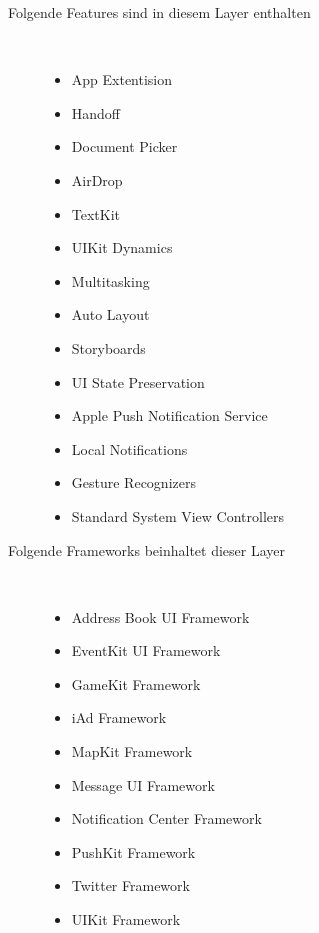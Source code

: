 \begin{description}
\begin{itemize}
		\begin{description}
		\item[Folgende Features sind in diesem Layer enthalten]~\par
		\begin{multicols}{2}
		\begin{itemize}
			\item App Extentision
			\item Handoff
			\item Document Picker
			\item AirDrop
			\item TextKit
			\item UIKit Dynamics
			\item Multitasking
			\item Auto Layout
			\item Storyboards
			\item UI State Preservation
			\item Apple Push Notification Service
			\item Local Notifications
			\item Gesture Recognizers
			\item Standard System View Controllers
         	\end{itemize}
		\end{multicols}
		\end{description}
		\begin{description}
		\item[Folgende Frameworks beinhaltet dieser Layer]~\par
		\begin{multicols}{2}
		\begin{itemize}
			\item Address Book UI Framework
			\item EventKit UI Framework
			\item GameKit Framework
			\item iAd Framework
			\item MapKit Framework
			\item Message UI Framework
			\item Notification Center Framework
			\item PushKit Framework
			\item Twitter Framework
			\item UIKit Framework
         	\end{itemize}
		\end{multicols}
		\end{description}

         \end{itemize} 
\end{description}

